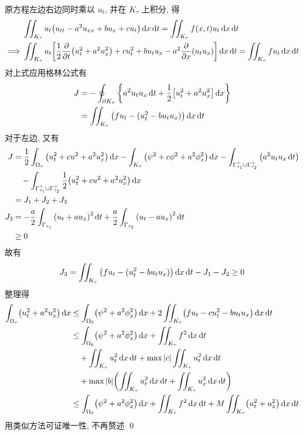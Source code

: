\begin{solution}
原方程左边右边同时乘以 $u_t$, 并在 $K_\tau$ 上积分, 得
\begin{align*}
& \iint_{K_\tau} u_t \mclosure{
    u_{tt} - a^2 u_{xx} + b u_x + c u_t
} \diff x \diff t
= \iint_{K_\tau} f(x, t) u_t \diff x \diff t \\
\implies & \iint_{K_\tau} u_t \biggl[
    \frac12 \fracpartials{t} \mclosure{u_t^2 + a^2 u_x^2}
    + c u_t^2 + b u_t u_x
    - a^2 \fracpartials{x} \mclosure{u_t u_x}
\biggr] \diff x \diff t = \iint_{K_\tau} f u_t \diff x \diff t
\end{align*}
对上式应用格林公式有
\begin{align*}
J &= -\oint_{\partial K_\tau} {\left\{ {
    a^2 u_t u_x \operatorname{d\!} t + \frac12 {\left[ { u_t^2 + a^2 u_x^2 } \right]} \operatorname{d\!} x
} \right\}} \\
&= \iint_{K_\tau} {\left( { f u_t - (u_t^2 - b u_t u_x) } \right)} \operatorname{d\!} x \operatorname{d\!} t
\end{align*}
对于左边, 又有
\begin{align*}
J &= \frac12 \int_{\Omega_\tau} {\left( {u_t^2 + cu^2 + a^2 u_x^2} \right)} \operatorname{d\!} x
- \int_{K_\tau} {\left( {\psi^2 + c\phi^2 + a^2 \phi_x^2} \right)} \operatorname{d\!} x
- \int_{\Gamma_{\tau_1}^{+}\cup\Gamma_{\tau_2}^{+}} {\left( {
    a^2 u_t u_x \operatorname{d\!} t
} \right)} \\
&\quad- \int_{\Gamma_{\tau_1}^{+}\cup\Gamma_{\tau_2}^{+}} \frac12 {\left( {
    u_t^2 + c u^2 + a^2 u_x^2
} \right)} \operatorname{d\!} x \\
&= J_1 + J_2 + J_3 \\
J_3 &= -\frac{a}{2} \int_{\Gamma_{\tau_1}} {\left( {
    u_t + a u_x
} \right)}^2 \operatorname{d\!} t + \frac{a}{2} \int_{\Gamma_{\tau_2}} {\left( {
    u_t - a u_x
} \right)}^2 \operatorname{d\!} t \\
&\geq 0
\end{align*}
故有
\[
J_3 = \iint_{K_\tau} {\left( {
    f u_t - (u_t^2 - b u_t u_x)
} \right)} \operatorname{d\!} x \operatorname{d\!} t - J_1 - J_2 \geq 0
\]
整理得
\begin{align*}
\int_{\Omega_\tau} \bigl( u_t^2 + a^2 u_x^2 \bigr) \diff x
&\leq \int_{\Omega_0} \bigl( \psi^2 + a^2 \phi_x^2 \bigr) \diff x
+ 2 \iint_{K_\tau} \bigl( f u_t - c u_t^2 - b u_t u_x \bigr) \diff x \diff t \\
&\leq \int_{\Omega_0} \bigl( \psi^2 + a^2 \phi_x^2 \bigr) \diff x
    + \iint_{K_\tau} f^2\diff x\diff t \\
&\quad+ \iint_{K_\tau} u_t^2\diff x\diff t
    + \max\abs{c} \iint_{K_\tau} u_t^2 \diff x \diff t \\
&\quad+ \max\abs{b} \biggl(
    \iint_{K_\tau} u_t^2 \diff x \diff t
    + \iint_{K_\tau} u_x^2 \diff x \diff t
\biggr) \\
&\leq \int_{\Omega_0} \bigl( \psi^2 + a^2 \phi_x^2 \bigr) \diff x
    +\iint_{K_\tau} f^2\diff x\diff t
    + M \iint_{K_\tau} \bigl( u_t^2 + u_x^2 \bigr) \diff x \diff t
\end{align*}
用类似方法可证唯一性, 不再赘述
\qed
\end{solution}
